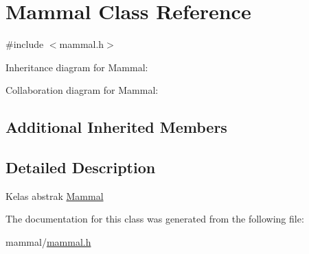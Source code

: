 \hypertarget{classMammal}{}\section{Mammal Class Reference}
\label{classMammal}


{\ttfamily \#include $<$mammal.\+h$>$}



Inheritance diagram for Mammal\+:


Collaboration diagram for Mammal\+:
\subsection*{Additional Inherited Members}


\subsection{Detailed Description}
Kelas abstrak \hyperlink{classMammal}{Mammal} 

The documentation for this class was generated from the following file\+:\begin{DoxyCompactItemize}
\item 
mammal/\hyperlink{mammal_8h}{mammal.\+h}\end{DoxyCompactItemize}
